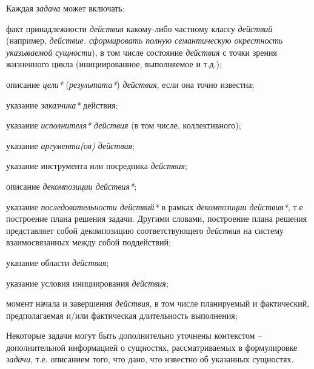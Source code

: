 \begin{SCn}
{Каждая \textit{задача} может включать:
\begin{scnitemize}
    \item факт принадлежности \textit{действия} какому-либо частному классу \textit{действий} (например,\textit{ действие. сформировать полную семантическую окрестность указываемой сущности}), в том числе состояние \textit{действия} с точки зрения жизненного цикла (инициированное, выполняемое и т.д.);
    \item описание \textit{цели*} (\textit{результата*}) \textit{действия}, если она точно известна;
    \item указание \textit{заказчика*} действия;
    \item указание \textit{исполнителя* действия} (в том числе, коллективного);
    \item указание \textit{аргумента(ов) действия\scnrolesign};
    \item указание инструмента или посредника \textit{действия};
    \item описание \textit{декомпозиции действия*};
    \item указание \textit{последовательности действий*} в рамках \textit{декомпозиции действия*}, т.е построение плана решения задачи. Другими словами, построение плана решения представляет собой декомпозицию соответствующего \textit{действия} на систему взаимосвязанных между собой поддействий;
    \item указание области \textit{действия};
    \item указание условия инициирования \textit{действия};
    \item момент начала и завершения \textit{действия}, в том числе планируемый и фактический, предполагаемая и/или фактическая длительность выполнения;
\end{scnitemize}
Некоторые задачи могут быть дополнительно уточнены контекстом -- дополнительной информацией о сущностях, рассматриваемых в формулировке \textit{задачи}, т.е. описанием того, что дано, что известно об указанных сущностях.
 
}
\end{SCn}
